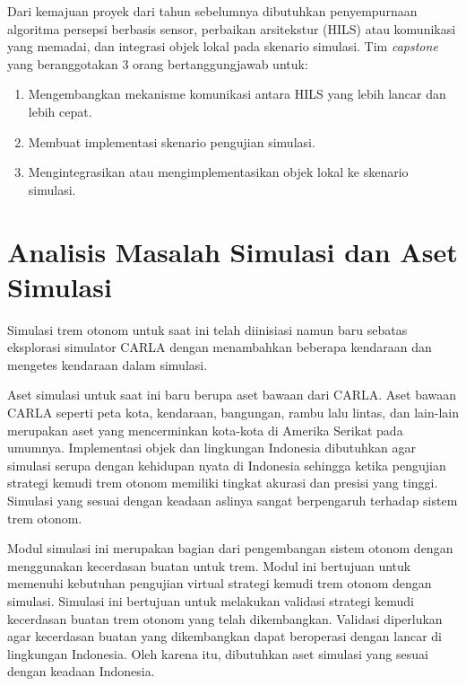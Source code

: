 Dari kemajuan proyek dari tahun sebelumnya dibutuhkan  penyempurnaan algoritma
persepsi berbasis sensor, perbaikan arsitekstur (HILS) atau komunikasi yang
memadai, dan integrasi objek lokal pada skenario simulasi. Tim \textit{capstone}
yang beranggotakan 3 orang bertanggungjawab untuk:

\begin{enumerate}

	\item Mengembangkan mekanisme komunikasi antara HILS yang lebih lancar dan
	lebih cepat.
	\item Membuat implementasi skenario pengujian simulasi.
	\item Mengintegrasikan atau mengimplementasikan objek lokal ke skenario
	simulasi.

\end{enumerate}


\section{Analisis Masalah Simulasi dan Aset Simulasi}

Simulasi trem otonom untuk saat ini telah diinisiasi namun baru sebatas
eksplorasi simulator CARLA dengan menambahkan beberapa kendaraan dan mengetes
kendaraan dalam simulasi.



Aset simulasi untuk saat ini baru berupa aset bawaan
dari CARLA. Aset bawaan CARLA seperti peta kota, kendaraan, bangungan, rambu
lalu lintas, dan lain-lain merupakan aset yang mencerminkan kota-kota di Amerika
Serikat pada umumnya. Implementasi objek dan lingkungan Indonesia dibutuhkan
agar simulasi serupa dengan kehidupan nyata di Indonesia sehingga ketika
pengujian strategi kemudi trem otonom memiliki tingkat akurasi dan presisi yang
tinggi. Simulasi yang sesuai dengan keadaan aslinya sangat berpengaruh terhadap
sistem trem otonom.

Modul simulasi ini merupakan bagian dari pengembangan sistem otonom dengan
menggunakan kecerdasan buatan untuk trem. Modul ini bertujuan untuk memenuhi
kebutuhan pengujian virtual strategi kemudi trem otonom dengan simulasi.
Simulasi ini bertujuan untuk melakukan validasi strategi kemudi kecerdasan
buatan trem otonom yang telah dikembangkan. Validasi diperlukan agar kecerdasan
buatan yang dikembangkan dapat beroperasi dengan lancar di lingkungan Indonesia.
Oleh karena itu, dibutuhkan aset simulasi yang sesuai dengan keadaan Indonesia.

